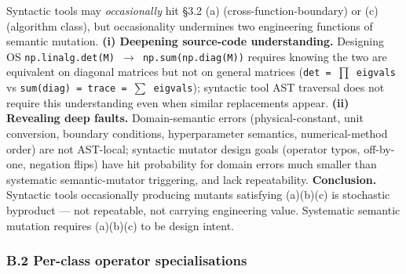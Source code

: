 \documentclass[review,12pt,authoryear]{elsarticle}
\begin{document}
Syntactic tools may \emph{occasionally} hit §3.2 (a)
(cross-function-boundary) or (c) (algorithm class), but occasionality
undermines two engineering functions of semantic mutation. \textbf{(i)
Deepening source-code understanding.} Designing OS
\texttt{np.linalg.det(M)\ $\to$\ np.sum(np.diag(M))} requires knowing the
two are equivalent on diagonal matrices but not on general matrices
(\texttt{det\ =\ $\prod$\ eigvals} vs
\texttt{sum(diag)\ =\ trace\ =\ $\sum$\ eigvals}); syntactic tool AST
traversal does not require this understanding even when similar
replacements appear. \textbf{(ii) Revealing deep faults.}
Domain-semantic errors (physical-constant, unit conversion, boundary
conditions, hyperparameter semantics, numerical-method order) are not
AST-local; syntactic mutator design goals (operator typos, off-by-one,
negation flips) have hit probability for domain errors much smaller than
systematic semantic-mutator triggering, and lack repeatability.
\textbf{Conclusion.} Syntactic tools occasionally producing mutants
satisfying (a)(b)(c) is stochastic byproduct --- not repeatable, not
carrying engineering value. Systematic semantic mutation requires
(a)(b)(c) to be design intent.

\subsubsection{B.2 Per-class operator
specialisations}\label{b.2-per-class-operator-specialisations}
\end{document}
